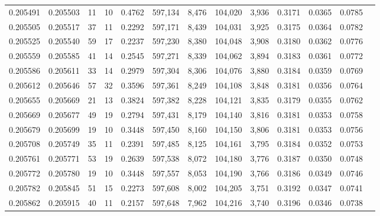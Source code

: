 \begin{tabular}{rrrrrrrrrrrrr}
0.205491 & 0.205503 &    11 &  10 &                                     0.4762 & 597,134 &   8,476 & 104,020 &   3,936 & 0.3171 & 0.0365 & 0.0785 \\
0.205505 & 0.205517 &    37 &  11 &                                     0.2292 & 597,171 &   8,439 & 104,031 &   3,925 & 0.3175 & 0.0364 & 0.0782 \\
0.205525 & 0.205540 &    59 &  17 &                                     0.2237 & 597,230 &   8,380 & 104,048 &   3,908 & 0.3180 & 0.0362 & 0.0776 \\
0.205559 & 0.205585 &    41 &  14 &                                     0.2545 & 597,271 &   8,339 & 104,062 &   3,894 & 0.3183 & 0.0361 & 0.0772 \\
0.205586 & 0.205611 &    33 &  14 &                                     0.2979 & 597,304 &   8,306 & 104,076 &   3,880 & 0.3184 & 0.0359 & 0.0769 \\
0.205612 & 0.205646 &    57 &  32 &                                     0.3596 & 597,361 &   8,249 & 104,108 &   3,848 & 0.3181 & 0.0356 & 0.0764 \\
0.205655 & 0.205669 &    21 &  13 &                                     0.3824 & 597,382 &   8,228 & 104,121 &   3,835 & 0.3179 & 0.0355 & 0.0762 \\
0.205669 & 0.205677 &    49 &  19 &                                     0.2794 & 597,431 &   8,179 & 104,140 &   3,816 & 0.3181 & 0.0353 & 0.0758 \\
0.205679 & 0.205699 &    19 &  10 &                                     0.3448 & 597,450 &   8,160 & 104,150 &   3,806 & 0.3181 & 0.0353 & 0.0756 \\
0.205708 & 0.205749 &    35 &  11 &                                     0.2391 & 597,485 &   8,125 & 104,161 &   3,795 & 0.3184 & 0.0352 & 0.0753 \\
0.205761 & 0.205771 &    53 &  19 &                                     0.2639 & 597,538 &   8,072 & 104,180 &   3,776 & 0.3187 & 0.0350 & 0.0748 \\
0.205772 & 0.205780 &    19 &  10 &                                     0.3448 & 597,557 &   8,053 & 104,190 &   3,766 & 0.3186 & 0.0349 & 0.0746 \\
0.205782 & 0.205845 &    51 &  15 &                                     0.2273 & 597,608 &   8,002 & 104,205 &   3,751 & 0.3192 & 0.0347 & 0.0741 \\
0.205862 & 0.205915 &    40 &  11 &                                     0.2157 & 597,648 &   7,962 & 104,216 &   3,740 & 0.3196 & 0.0346 & 0.0738 \\

\end{tabular}
